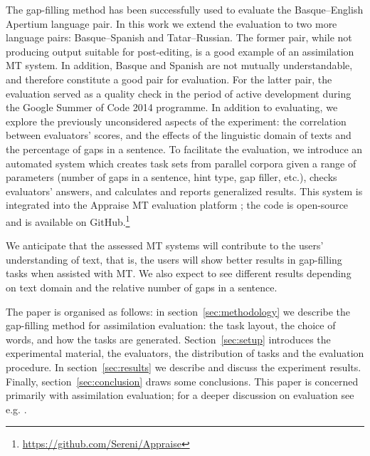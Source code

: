 \documentclass[11pt]{article}
\newcommand{\comment}[1]{}
\begin{document}
The gap-filling method has been successfully used to evaluate the Basque--English Apertium language pair. In this work we extend the evaluation to two more language pairs: Basque--Spanish and Tatar--Russian. The former pair, while not producing output suitable for post-editing, is a good example of an assimilation MT system. In addition, Basque and Spanish are not mutually understandable, and therefore constitute a good pair for evaluation. For the latter pair, the evaluation served as a quality check in the period of active development during the Google Summer of Code 2014 programme. In addition to evaluating, we explore the previously unconsidered aspects of the experiment: the correlation between evaluators' scores, and the effects of the linguistic domain of texts and the percentage of gaps in a sentence. To facilitate the evaluation, we introduce an automated system which creates task sets from parallel corpora given a range of parameters (number of gaps in a sentence, hint type, gap filler,\comment{MLF: gap filler or gap marker?} \comment{EA: well, initially we had questions with lemmas in place of gaps, and also multiple choice questions where answer options got generated automatically. This is not used in this evaluation, but it's still in the toolkit. Should I remove?} etc.), checks evaluators' answers, and calculates and reports generalized results. This system is integrated into the Appraise MT evaluation platform \citep{federmann12}; the code is open-source and is available on GitHub.\footnote{{\url{https://github.com/Sereni/Appraise}}}

We anticipate that the assessed MT systems will contribute to the users' understanding of text, that is, the users will show better results in gap-filling tasks when assisted with MT. We also expect to see different results depending on text domain and the relative number of gaps in a sentence.

The paper is organised as follows: in section~\ref{sec:methodology} we describe the gap-filling method for assimilation evaluation: the task layout, the choice of words, and how the tasks are generated. Section~\ref{sec:setup} introduces the experimental material, the evaluators, the distribution of tasks and the evaluation procedure. In section~\ref{sec:results} we describe and discuss the experiment results. Finally, section~\ref{sec:conclusion} draws some conclusions. This paper is concerned primarily with assimilation evaluation; for a deeper discussion on evaluation see e.g. \citep[ch.~8]{koehn2010}.
\end{document}
